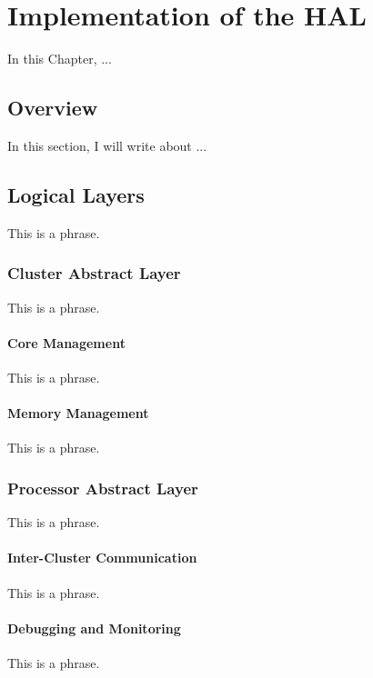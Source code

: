 \chapter{Implementation of the HAL}
\label{ch.development}

In this Chapter, ...

\section{Overview}
    In this section, I will write about ...

\section{Logical Layers}
    This is a phrase.

\subsection{Cluster Abstract Layer}
    This is a phrase.

\subsubsection{Core Management}
    This is a phrase.

\subsubsection{Memory Management}
    This is a phrase.

\subsection{Processor Abstract Layer}
    This is a phrase.

\subsubsection{Inter-Cluster Communication}
    This is a phrase.

\subsubsection{Debugging and Monitoring}
    This is a phrase.
